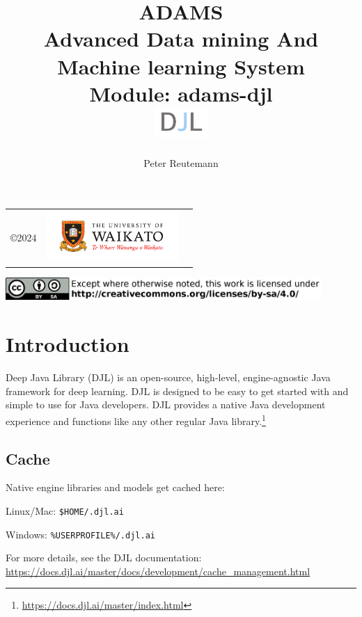 \documentclass[a4paper]{book}
\title{
  \textbf{ADAMS} \\
  {\Large \textbf{A}dvanced \textbf{D}ata mining \textbf{A}nd \textbf{M}achine
  learning \textbf{S}ystem} \\
  {\Large Module: adams-djl} \\
  \vspace{1cm}
  \includegraphics[width=2cm]{images/djl-module.png} \\
}
\author{
  Peter Reutemann
}
\begin{document}
\begin{titlepage}
\maketitle

\thispagestyle{empty}
\center
\begin{table}[b]
	\begin{tabular}{c l l}
		\parbox[c][2cm]{2cm}{\copyright 2024} &
		\parbox[c][2cm]{5cm}{\includegraphics[width=5cm]{images/coat_of_arms.pdf}} \\
	\end{tabular}
	\includegraphics[width=12cm]{images/cc.png} \\
\end{table}

\end{titlepage}

\tableofcontents


\chapter{Introduction}
Deep Java Library (DJL) is an open-source, high-level, engine-agnostic Java framework for deep learning.
DJL is designed to be easy to get started with and simple to use for Java developers. DJL provides a native
Java development experience and functions like any other regular Java library.\footnote{\url{https://docs.djl.ai/master/index.html}{}}

\section{Cache}
Native engine libraries and models get cached here:
\begin{tight_itemize}
    \item Linux/Mac: \verb|$HOME/.djl.ai|
    \item Windows: \verb|%USERPROFILE%/.djl.ai|
\end{tight_itemize}
For more details, see the DJL documentation: \\
\url{https://docs.djl.ai/master/docs/development/cache_management.html}{}


\end{document}
